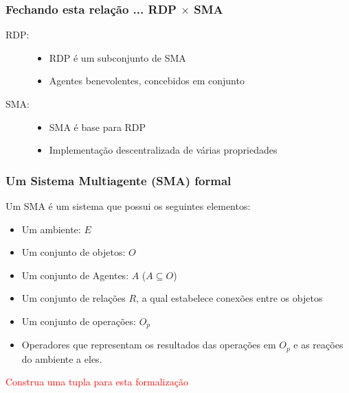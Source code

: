 

\begin{frame} %

\frametitle{Fechando esta relação ... RDP $\times$ SMA }

\begin{block}
  
  \begin{description}
    \item[RDP:] 
    \begin{itemize}
      \item RDP é um subconjunto de SMA
      \item Agentes benevolentes, concebidos em conjunto
    \end{itemize}
    
    \item[SMA:]
    \begin{itemize}
      \item SMA é base para RDP
      \item Implementação descentralizada de várias propriedades
    \end{itemize}
     
  \end{description}
   
\end{block}

\end{frame}




\begin{frame} %

\frametitle{Um Sistema Multiagente (SMA) formal}

\begin{block}{Um SMA é um sistema que possui os seguintes elementos:}
  \begin{itemize}
    \item Um ambiente: $E$
    \item Um conjunto de objetos: $O$
    \item Um conjunto de Agentes: $A$ ($A\subseteq O$)
    \item Um conjunto de relações $R$, a qual estabelece
    conexões entre os objetos
    \item Um conjunto de operações: $O_p$
    \item Operadores que representam os resultados das operações em $O_p$
     e as reações do ambiente a eles.
       
  \end{itemize}
   
\end{block}

\textcolor{red}{Construa uma tupla para esta formalização}


\end{frame}



